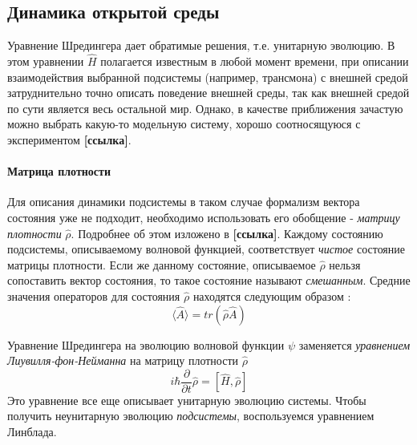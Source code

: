 \documentclass[12pt, twoside]{report}
\numberwithin{equation}{section}
\numberwithin{figure}{section}
\begin{document}
\subsection{Динамика открытой среды}
Уравнение Шредингера дает обратимые решения, т.е. унитарную эволюцию. В этом уравнении $\hat{H}$ полагается известным в любой момент времени, при описании взаимодействия выбранной подсистемы (например, трансмона) с внешней средой затруднительно точно описать поведение внешней среды, так как внешней средой по сути является весь остальной мир. Однако, в качестве приближения зачастую можно выбрать какую-то модельную систему, хорошо соотносящуюся с экспериментом \textbf{[ссылка]}. 
\newline
\paragraph{Матрица плотности}
Для описания динамики подсистемы в таком случае формализм вектора состояния уже не подходит, необходимо использовать его обобщение - \textit{матрицу плотности} $\hat{\rho}$. Подробнее об этом изложено в \textbf{[ссылка]}. Каждому состоянию подсистемы, описываемому волновой функцией, соответствует \textit{чистое} состояние матрицы плотности. Если же данному состояние, описываемое $\hat{\rho}$ нельзя сопоставить вектор состояния, то такое состояние называют \textit{смешанным}. Средние значения операторов для состояния $\hat{\rho}$ находятся следующим образом :
$$ \langle \hat{A} \rangle = tr \left(\hat{\rho} \hat{A} \right) $$
 
Уравнение Шредингера на эволюцию волновой функции $\psi$ заменяется \textit{уравнением Лиувилля-фон-Нейманна} на матрицу плотности $\hat{\rho}$
\begin{equation}
i \hbar \frac{\partial}{\partial t} \hat{\rho} = \left[ \hat{H}, \hat{\rho} \right]
\label{eq:neumann-equation}
\end{equation}  
Это уравнение все еще описывает унитарную эволюцию системы. Чтобы получить неунитарную эволюцию \textit{подсистемы}, воспользуемся уравнением Линблада.
\end{document}
